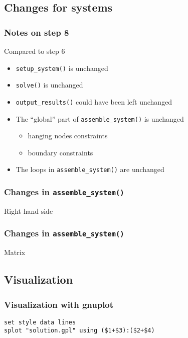 \subsection{Changes for systems}
\begin{frame}
  \frametitle{Notes on step 8}
  Compared to step 6
  \begin{itemize}
  \item \lstinline!setup_system()! is unchanged
  \item \lstinline!solve()! is unchanged
  \item \lstinline!output_results()! could have been left unchanged
  \item The ``global'' part of \lstinline!assemble_system()! is
    unchanged
    \begin{itemize}
    \item hanging nodes constraints
    \item boundary constraints
    \end{itemize}
  \item The loops in \lstinline!assemble_system()! are unchanged
  \end{itemize}
\end{frame}

\begin{frame}
  \frametitle{Changes in \lstinline!assemble_system()!}
  \begin{block}{Right hand side}
    
  \end{block}
\end{frame}

\begin{frame}
  \frametitle{Changes in \lstinline!assemble_system()!}
  \begin{block}{Matrix}
    
  \end{block}
\end{frame}

\subsection{Visualization}
\begin{frame}[fragile]
  \frametitle{Visualization with gnuplot}
  \begin{block}{}
\begin{verbatim}
set style data lines
splot "solution.gpl" using ($1+$3):($2+$4)
\end{verbatim}
  \end{block}
\end{frame}

